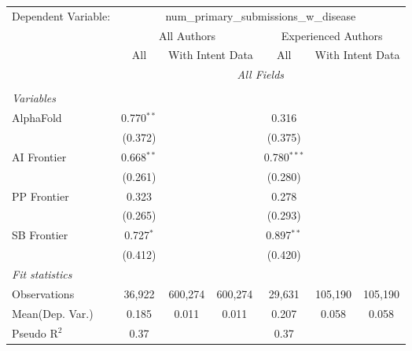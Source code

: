 \begingroup
\centering
\begin{tabular}{lcccccc}
   \tabularnewline \midrule \midrule
   Dependent Variable: & \multicolumn{6}{c}{num\_primary\_submissions\_w\_disease}\\
 & \multicolumn{3}{c}{All Authors} & \multicolumn{3}{c}{Experienced Authors} \\
\cmidrule(lr){2-4} \cmidrule(lr){5-7}
 & \multicolumn{1}{c}{All} & \multicolumn{2}{c}{With Intent Data} & \multicolumn{1}{c}{All} & \multicolumn{2}{c}{With Intent Data} \\
\cmidrule(lr){2-2} \cmidrule(lr){3-4} \cmidrule(lr){5-5} \cmidrule(lr){6-7}
 & \multicolumn{6}{c}{\textit{All Fields}} \\ \\
   \emph{Variables}\\
   AlphaFold    & 0.770$^{**}$ &         &         & 0.316         &         &   \\   
                & (0.372)      &         &         & (0.375)       &         &   \\   
   AI Frontier  & 0.668$^{**}$ &         &         & 0.780$^{***}$ &         &   \\   
                & (0.261)      &         &         & (0.280)       &         &   \\   
   PP Frontier  & 0.323        &         &         & 0.278         &         &   \\   
                & (0.265)      &         &         & (0.293)       &         &   \\   
   SB Frontier  & 0.727$^{*}$  &         &         & 0.897$^{**}$  &         &   \\   
                & (0.412)      &         &         & (0.420)       &         &   \\   
   \midrule
   \emph{Fit statistics}\\
   Observations & 36,922       & 600,274 & 600,274 & 29,631        & 105,190 & 105,190\\  
Mean(Dep. Var.) & 0.185 & 0.011 & 0.011 & 0.207 & 0.058 & 0.058 \\
   Pseudo R$^2$ & 0.37         &         &         & 0.37          &         & \\  
   

\end{tabular}
